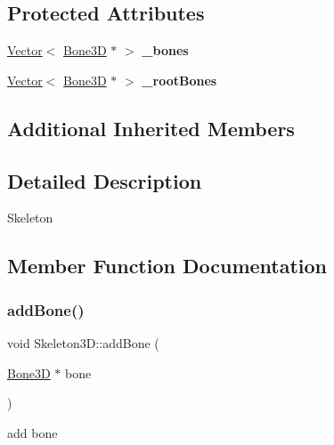\subsection*{Protected Attributes}
\begin{DoxyCompactItemize}
\item 
\mbox{\label{classSkeleton3D_a814c5f1fb697cd8b5dff966fc75e7a80}} 
\hyperlink{classVector}{Vector}$<$ \hyperlink{classBone3D}{Bone3D} $\ast$ $>$ {\bfseries \+\_\+bones}
\item 
\mbox{\label{classSkeleton3D_a59742064fd819bfe5565bab58f5aea9a}} 
\hyperlink{classVector}{Vector}$<$ \hyperlink{classBone3D}{Bone3D} $\ast$ $>$ {\bfseries \+\_\+root\+Bones}
\end{DoxyCompactItemize}
\subsection*{Additional Inherited Members}


\subsection{Detailed Description}
Skeleton 

\subsection{Member Function Documentation}
\mbox{\label{classSkeleton3D_a73a1f94a7e99d7a06c4a078203a6f793}} 
\subsubsection{\texorpdfstring{add\+Bone()}{addBone()}\hspace{0.1cm}{\footnotesize\ttfamily [1/2]}}
{\footnotesize\ttfamily void Skeleton3\+D\+::add\+Bone (\begin{DoxyParamCaption}\item[{\hyperlink{classBone3D}{Bone3D} $\ast$}]{bone }\end{DoxyParamCaption})}

add bone \mbox{\label{classSkeleton3D_a73a1f94a7e99d7a06c4a078203a6f793}} 
